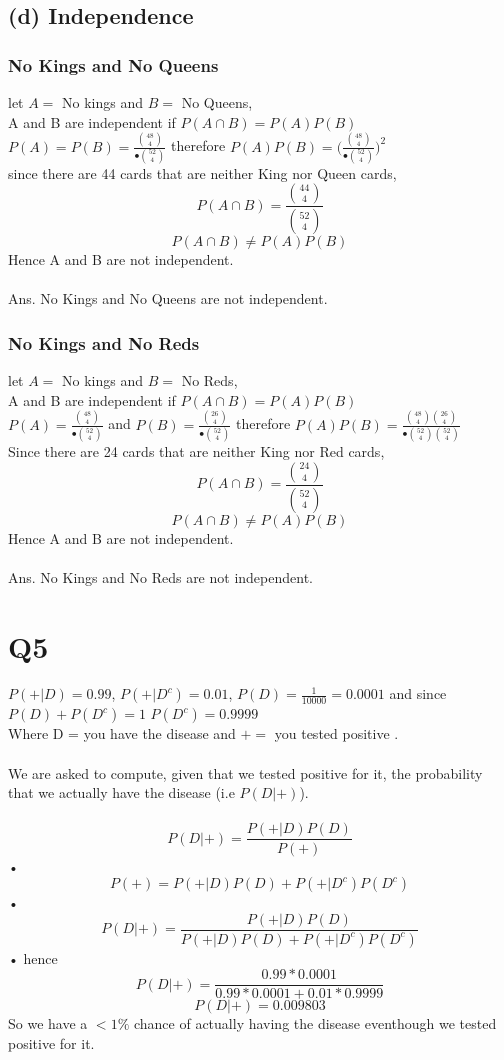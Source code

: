 \documentclass[a4paper,11pt]{article}
\begin{document}
\subsection*{(d) Independence}
\subsubsection*{No Kings and No Queens}
let $A =$ No kings and $B = $ No Queens,\\ A and B are independent if $P(A \cap B) = P(A)P(B)$\\
$P(A)= P(B)= \frac{{48 \choose 4}}{•{52 \choose 4}}$ therefore $P(A)P(B) = \Bigg(\frac{{48 \choose 4}}{•{52 \choose 4}}\Bigg)^2$ \\
since there are 44 cards that are neither King nor Queen cards, \\ $$P(A \cap B) = \frac{{44 \choose 4}}{{52 \choose 4}}$$
$$P(A \cap B) \neq P(A)P(B)$$ Hence A and B are not independent.\\\\
Ans. No Kings and No Queens are not independent. 
\subsubsection*{No Kings and No Reds}
let $A =$ No kings and $B = $ No Reds,\\ A and B are independent if $P(A \cap B) = P(A)P(B)$\\
$P(A)= \frac{{48 \choose 4}}{•{52 \choose 4}}$ and $P(B) = \frac{{26 \choose 4}}{•{52 \choose 4}}$ therefore $P(A)P(B) = \frac{{48 \choose 4}{26 \choose 4}}{•{52 \choose 4}{52 \choose 4}}$ \\
Since there are 24 cards that are neither King nor Red  cards, $$P(A \cap B) = \frac{{24 \choose 4}}{{52 \choose 4}}$$
$$P(A \cap B) \neq P(A)P(B)$$ Hence A and B are not independent.\\\\
Ans. No Kings and No Reds are not independent. 
\newpage
\section*{Q5}
$P(+|D)=0.99$, $P(+|D^{c})=0.01$, $P(D)=\frac{1}{10000}=0.0001$ and since $P(D)+ P(D^c) = 1$ $P(D^c) = 0.9999$\\ 
Where D = you have the disease and $+ = $ you tested positive .\\\\
We are asked to compute, given that we tested positive for it, the probability that we actually have the disease (i.e $P(D|+)$).\\\\
\begin{equation}
P(D|+) =\frac{P(+|D)P(D)}{P(+)}
\end{equation}• 
\begin{equation}
P(+) = P(+|D)P(D) +P(+|D^c)P(D^c)
\end{equation}• 
\begin{equation}
P(D|+) =\frac{P(+|D)P(D)}{ P(+|D)P(D) +P(+|D^c)P(D^c)}
\end{equation}• 
hence 
$$P(D|+) = \frac{0.99*0.0001}{0.99*0.0001  + 0.01*0.9999}$$
$$P(D|+) = 0.009803$$
So we have a $<1\%$  chance of actually having the disease eventhough we tested positive for it.
\newpage
\end{document}
